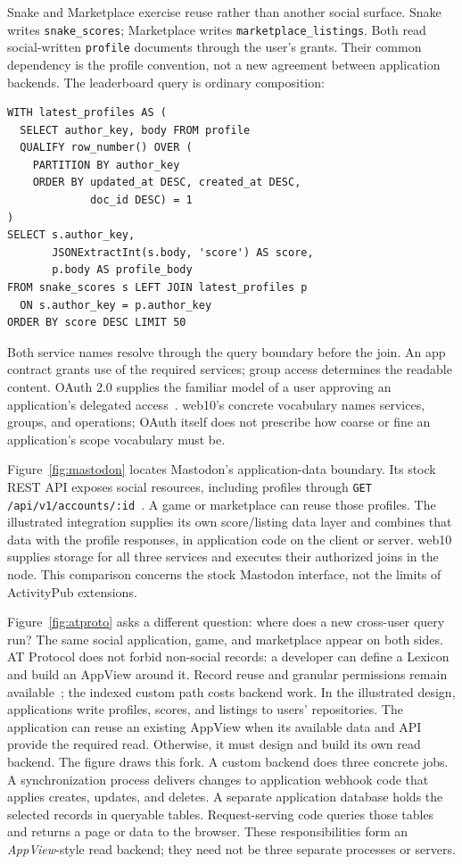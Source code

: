 \documentclass[sigconf, nonacm]{acmart}
\begin{document}
Snake and Marketplace exercise reuse rather than another social surface.
Snake writes \texttt{snake\_scores}; Marketplace writes
\texttt{marketplace\_listings}. Both read social-written
\texttt{profile} documents through the user's grants. Their common
dependency is the profile convention, not a new agreement between
application backends. The leaderboard query is ordinary composition:
\begin{minipage}{\columnwidth}
\begin{lstlisting}[style=sql]
WITH latest_profiles AS (
  SELECT author_key, body FROM profile
  QUALIFY row_number() OVER (
    PARTITION BY author_key
    ORDER BY updated_at DESC, created_at DESC,
             doc_id DESC) = 1
)
SELECT s.author_key,
       JSONExtractInt(s.body, 'score') AS score,
       p.body AS profile_body
FROM snake_scores s LEFT JOIN latest_profiles p
  ON s.author_key = p.author_key
ORDER BY score DESC LIMIT 50
\end{lstlisting}
\end{minipage}
Both service names resolve through the query boundary before the join.
An app contract grants use of the required services; group access
determines the readable content. OAuth 2.0 supplies the familiar model
of a user approving an application's delegated access~\cite{oauth2012}.
web10's concrete vocabulary names services, groups, and operations;
OAuth itself does not prescribe how coarse or fine an application's
scope vocabulary must be.

Figure~\ref{fig:mastodon} locates Mastodon's application-data boundary.
Its stock REST API exposes social resources, including profiles
through \texttt{GET /api/v1/accounts/:id}~\cite{mastodon-rest,mastodon-accounts}.
A game or marketplace can reuse those profiles. The illustrated
integration supplies its own score/listing data layer and combines that
data with the profile responses, in application code on the client or
server. web10 supplies storage for all three services and executes their
authorized joins in the node. This comparison concerns the stock
Mastodon interface, not the limits of ActivityPub extensions.

Figure~\ref{fig:atproto} asks a different question: where does a new
cross-user query run? The same social application, game, and marketplace
appear on both sides. AT Protocol does not forbid non-social records:
a developer can define a Lexicon and build an AppView around it. Record
reuse and granular permissions remain available~\cite{at-permissions};
the indexed custom path costs backend work. In the illustrated design,
applications write profiles, scores, and listings to users' repositories.
The application can reuse an existing AppView when its
available data and API provide the required read. Otherwise, it must
design and build its own read backend. The figure draws this fork.
A custom backend does three concrete jobs.
A synchronization process delivers changes to application webhook code
that applies creates, updates, and deletes. A separate application
database holds the selected records in queryable tables. Request-serving
code queries those tables and returns a page or data to the browser.
These responsibilities form an \emph{AppView}-style read backend; they
need not be three separate processes or servers.
\end{document}
